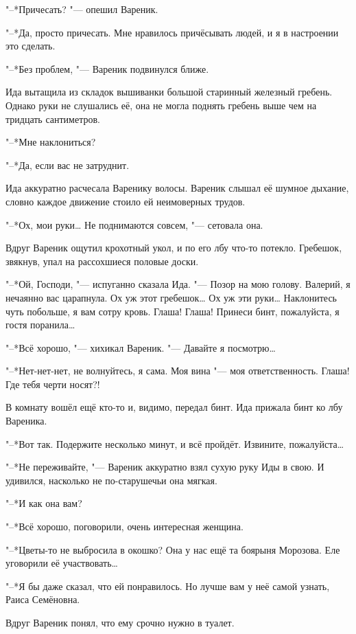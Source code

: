 "--*Причесать? "--- опешил Вареник.

"--*Да, просто причесать.
Мне нравилось причёсывать людей, и я в настроении это сделать.

"--*Без проблем, "--- Вареник подвинулся ближе.

Ида вытащила из складок вышиванки большой старинный железный гребень.
Однако руки не слушались её, она не могла поднять гребень выше чем на тридцать сантиметров.

"--*Мне наклониться?

"--*Да, если вас не затруднит.

Ида аккуратно расчесала Варенику волосы.
Вареник слышал её шумное дыхание, словно каждое движение стоило ей неимоверных трудов.

"--*Ох, мои руки\ldots{}
Не поднимаются совсем, "--- сетовала она.

Вдруг Вареник ощутил крохотный укол, и по его лбу что-то потекло.
Гребешок, звякнув, упал на рассохшиеся половые доски.

"--*Ой, Господи, "--- испуганно сказала Ида.
"--- Позор на мою голову.
Валерий, я нечаянно вас царапнула.
Ох уж этот гребешок\ldots{}
Ох уж эти руки\ldots{}
Наклонитесь чуть побольше, я вам сотру кровь.
Глаша!
Глаша!
Принеси бинт, пожалуйста, я гостя поранила\ldots{}

"--*Всё хорошо, "--- хихикал Вареник.
"--- Давайте я посмотрю\ldots{}

"--*Нет-нет-нет, не волнуйтесь, я сама.
Моя вина "--- моя ответственность.
Глаша!
Где тебя черти носят?!

В комнату вошёл ещё кто-то и, видимо, передал бинт.
Ида прижала бинт ко лбу Вареника.

"--*Вот так.
Подержите несколько минут, и всё пройдёт.
Извините, пожалуйста\ldots{}

"--*Не переживайте, "--- Вареник аккуратно взял сухую руку Иды в свою.
И удивился, насколько не по-старушечьи она мягкая.

\textspace

"--*И как она вам?

"--*Всё хорошо, поговорили, очень интересная женщина.

"--*Цветы-то не выбросила в окошко?
Она у нас ещё та боярыня Морозова.
Еле уговорили её участвовать\ldots{}

"--*Я бы даже сказал, что ей понравилось.
Но лучше вам у неё самой узнать, Раиса Семёновна.

Вдруг Вареник понял, что ему срочно нужно в туалет.

